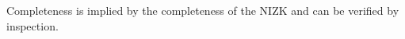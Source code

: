 Completeness is implied by the completeness of the NIZK and can be verified by inspection. 



%
%
%
%
%



